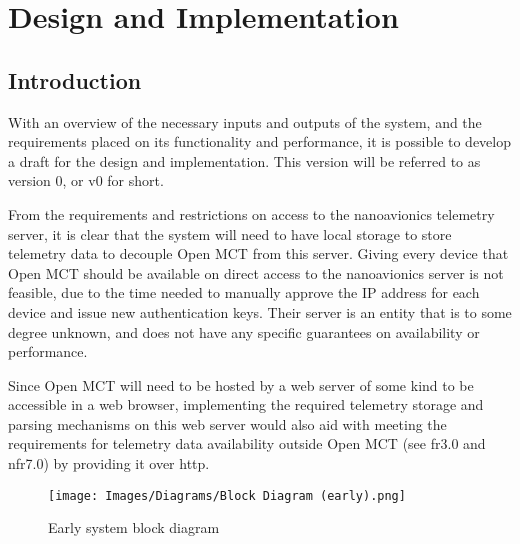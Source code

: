 \begin{comment}
Existing OpenMCT implementations

Design suggestion: Backend server in Node, which gets, parses and stores telemetry, and allows Open MCT and other users to request data in a simple and easily readable format
 - Abstracts away unknowns in connection to NA - rate limits, uptime, accessibility
 - Allows “offline” usage, load telemetry from file or other sources
 - Generate required OMCT data, servers and parsers from definition - trying to minimize code overhead for adding new data
 - Open MCT is the hard part; aim with code should be to minimize work required to get new inputs accessible in Open MCT, since it's the largest unknown
\end{comment}

\section{Design and Implementation}
\subsection{Introduction}
With an overview of the necessary inputs and outputs of the system, and the requirements placed on its functionality and performance, it is possible to develop a draft for the design and implementation. This version will be referred to as version 0, or v0 for short.

From the requirements and restrictions on access to the \Gls{nanoavionics} telemetry server, it is clear that the system will need to have local storage to store telemetry data to decouple Open MCT from this server. Giving every device that Open MCT should be available on direct access to the \Gls{nanoavionics} server is not feasible, due to the time needed to manually approve the IP address for each device and issue new authentication keys. Their server is an entity that is to some degree unknown, and does not have any specific guarantees on availability or performance. 

Since Open MCT will need to be hosted by a web server of some kind to be accessible in a web browser, implementing the required telemetry storage and parsing mechanisms on this web server would also aid with meeting the requirements for telemetry data availability outside Open MCT (see \acrshort{fr}3.0 and \acrshort{nfr}7.0) by providing it over \acrshort{http}.

\begin{figure}[H]
  \centering
  \texttt{[image: Images/Diagrams/Block Diagram (early).png]}
  \caption{Early system block diagram}
  \label{fig:block}
\end{figure}

